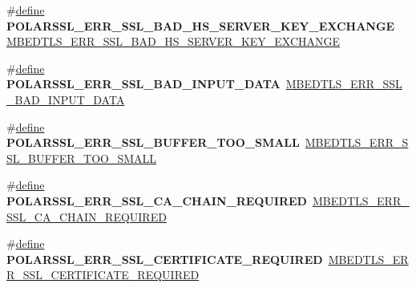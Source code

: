 \begin{DoxyCompactItemize}
\item 
\mbox{\label{compat-1_83_8h_abde15c07b9a03c3ff57e17163af425fc}} 
\#\hyperlink{structdefine}{define} {\bfseries P\+O\+L\+A\+R\+S\+S\+L\+\_\+\+E\+R\+R\+\_\+\+S\+S\+L\+\_\+\+B\+A\+D\+\_\+\+H\+S\+\_\+\+S\+E\+R\+V\+E\+R\+\_\+\+K\+E\+Y\+\_\+\+E\+X\+C\+H\+A\+N\+GE}~\hyperlink{ssl_8h_a732f296f4c1d605983d60bbd7b3b0e37}{M\+B\+E\+D\+T\+L\+S\+\_\+\+E\+R\+R\+\_\+\+S\+S\+L\+\_\+\+B\+A\+D\+\_\+\+H\+S\+\_\+\+S\+E\+R\+V\+E\+R\+\_\+\+K\+E\+Y\+\_\+\+E\+X\+C\+H\+A\+N\+GE}
\item 
\mbox{\label{compat-1_83_8h_adcb102bf6601922b468a812b6cbeea12}} 
\#\hyperlink{structdefine}{define} {\bfseries P\+O\+L\+A\+R\+S\+S\+L\+\_\+\+E\+R\+R\+\_\+\+S\+S\+L\+\_\+\+B\+A\+D\+\_\+\+I\+N\+P\+U\+T\+\_\+\+D\+A\+TA}~\hyperlink{ssl_8h_a665997e4474e4ce0db5ef408c9c6b5ce}{M\+B\+E\+D\+T\+L\+S\+\_\+\+E\+R\+R\+\_\+\+S\+S\+L\+\_\+\+B\+A\+D\+\_\+\+I\+N\+P\+U\+T\+\_\+\+D\+A\+TA}
\item 
\mbox{\label{compat-1_83_8h_af836572c0fb90e970c8a139867b99023}} 
\#\hyperlink{structdefine}{define} {\bfseries P\+O\+L\+A\+R\+S\+S\+L\+\_\+\+E\+R\+R\+\_\+\+S\+S\+L\+\_\+\+B\+U\+F\+F\+E\+R\+\_\+\+T\+O\+O\+\_\+\+S\+M\+A\+LL}~\hyperlink{ssl_8h_ad7215c366f66035c9b5a60918168e950}{M\+B\+E\+D\+T\+L\+S\+\_\+\+E\+R\+R\+\_\+\+S\+S\+L\+\_\+\+B\+U\+F\+F\+E\+R\+\_\+\+T\+O\+O\+\_\+\+S\+M\+A\+LL}
\item 
\mbox{\label{compat-1_83_8h_a8ca3ab1629e09f0d370e14ad11be523d}} 
\#\hyperlink{structdefine}{define} {\bfseries P\+O\+L\+A\+R\+S\+S\+L\+\_\+\+E\+R\+R\+\_\+\+S\+S\+L\+\_\+\+C\+A\+\_\+\+C\+H\+A\+I\+N\+\_\+\+R\+E\+Q\+U\+I\+R\+ED}~\hyperlink{ssl_8h_a31bcc2bfd103177e3e76e04219e0497f}{M\+B\+E\+D\+T\+L\+S\+\_\+\+E\+R\+R\+\_\+\+S\+S\+L\+\_\+\+C\+A\+\_\+\+C\+H\+A\+I\+N\+\_\+\+R\+E\+Q\+U\+I\+R\+ED}
\item 
\mbox{\label{compat-1_83_8h_aec0313a3fa877e3a3684756d2577d2b4}} 
\#\hyperlink{structdefine}{define} {\bfseries P\+O\+L\+A\+R\+S\+S\+L\+\_\+\+E\+R\+R\+\_\+\+S\+S\+L\+\_\+\+C\+E\+R\+T\+I\+F\+I\+C\+A\+T\+E\+\_\+\+R\+E\+Q\+U\+I\+R\+ED}~\hyperlink{ssl_8h_accee747c38c056e6bf1271b718b562dc}{M\+B\+E\+D\+T\+L\+S\+\_\+\+E\+R\+R\+\_\+\+S\+S\+L\+\_\+\+C\+E\+R\+T\+I\+F\+I\+C\+A\+T\+E\+\_\+\+R\+E\+Q\+U\+I\+R\+ED}
\item 

\end{DoxyCompactItemize}
